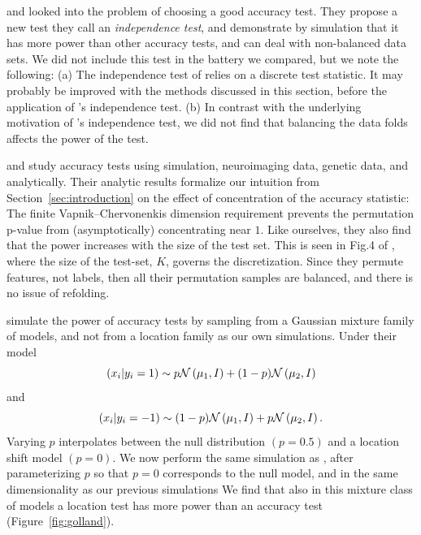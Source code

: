 \documentclass[12pt,a4paper]{article}
\begin{document}
\cite{olivetti_induction_2012} and \cite{olivetti_statistical_2014} looked into the problem of choosing a good accuracy test. 
They propose a new test they call an \emph{independence test}, and demonstrate by simulation that it has more power than other accuracy tests, and can deal with non-balanced data sets. 
We did not include this test in the battery we compared, but we note the following: 
(a) The independence test of \cite{olivetti_induction_2012} relies on a discrete test statistic. 
It may probably be improved with the methods discussed in this section, before the application of \cite{olivetti_induction_2012}'s independence test. 
(b) In contrast with the underlying motivation of \cite{olivetti_induction_2012}'s independence test, we did not find that balancing the data folds affects the power of the test. 


\cite{golland_permutation_2003} and \cite{golland_permutation_2005} study accuracy tests using simulation, neuroimaging data, genetic data, and analytically.
Their analytic results formalize our intuition from Section~\ref{sec:introduction} on the effect of concentration of the accuracy statistic:
The finite Vapnik–Chervonenkis dimension requirement \citep[Sec 4.3]{golland_permutation_2005} prevents the permutation p-value from (asymptotically) concentrating near $1$. 
Like ourselves, they also find that the power increases with the size of the test set. 
This is seen in Fig.4 of \citet{golland_permutation_2005}, where the size of the test-set, $K$, governs the discretization. 
Since they permute features, not labels, then all their permutation samples are balanced, and there is no issue of refolding. 

\cite{golland_permutation_2005} simulate the power of accuracy tests by sampling from a Gaussian mixture family of models, and not from a location family as our own simulations. 
Under their model 
$$(x_i|y_i=1) \sim p \mathcal{N}\left(\mu_1,I\right)+ (1-p) \mathcal{N}\left(\mu_2,I\right)$$ 
and 
$$(x_i|y_i=-1) \sim (1-p) \mathcal{N}\left(\mu_1,I\right)+ p \mathcal{N}\left(\mu_2,I\right).$$
Varying $p$ interpolates between the null distribution $(p=0.5)$ and a location shift model $(p=0)$. 
We now perform the same simulation as \cite{golland_permutation_2005}, after parameterizing $p$ so that $p=0$ corresponds to the null model, and in the same dimensionality as our previous simulations
We find that also in this mixture class of models a location test has more power than an accuracy test (Figure~\ref{fig:golland}).
\end{document}
